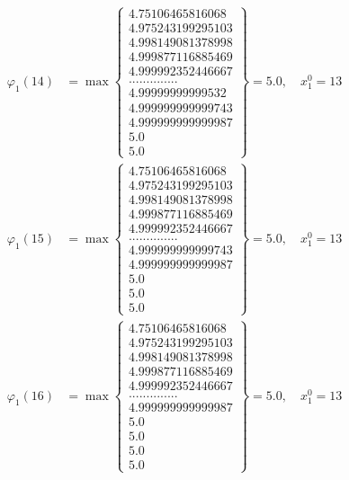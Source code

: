 \documentclass{article}
\begin{document}
\begin{align*}
  
  
  
\varphi_{1}(14) &= \max \left\{ \begin{array}{c}
4.75106465816068 \\
 4.975243199295103 \\
 4.998149081378998 \\
 4.999877116885469 \\
 4.999992352446667 \\
 .............. \\
 4.99999999999532 \\
 4.999999999999743 \\
 4.999999999999987 \\
 5.0 \\
 5.0
\end{array} \right\} = 5.0, \quad x_{1}^0 = 13\\
  
  
  
  
\varphi_{1}(15) &= \max \left\{ \begin{array}{c}
4.75106465816068 \\
 4.975243199295103 \\
 4.998149081378998 \\
 4.999877116885469 \\
 4.999992352446667 \\
 .............. \\
 4.999999999999743 \\
 4.999999999999987 \\
 5.0 \\
 5.0 \\
 5.0
\end{array} \right\} = 5.0, \quad x_{1}^0 = 13\\
  
  
  
  
\varphi_{1}(16) &= \max \left\{ \begin{array}{c}
4.75106465816068 \\
 4.975243199295103 \\
 4.998149081378998 \\
 4.999877116885469 \\
 4.999992352446667 \\
 .............. \\
 4.999999999999987 \\
 5.0 \\
 5.0 \\
 5.0 \\
 5.0
\end{array} \right\} = 5.0, \quad x_{1}^0 = 13\\
  

\end{align*}
\end{document}
